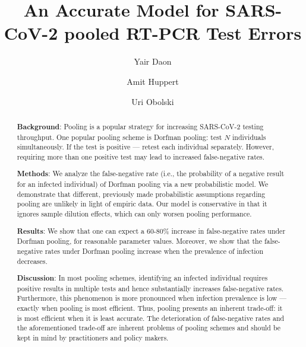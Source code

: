 \documentclass{article}
\begin{document}
\title{An Accurate Model for SARS-CoV-2 pooled RT-PCR Test Errors}

\author[1,2]{Yair Daon}
\author[1,3,*]{Amit Huppert}
\author[1,2,*]{Uri Obolski}



\date{}

\maketitle

\begin{abstract}
\textbf{Background}: Pooling is a popular strategy for increasing
SARS-CoV-2 testing throughput. One popular pooling scheme is Dorfman
pooling: test $N$ individuals simultaneously. If the test is positive
--- retest each individual separately. However, requiring more than
one positive test may lead to increased false-negative rates.

\textbf{Methods}: We analyze the false-negative rate (i.e., the
probability of a negative result for an infected individual) of
Dorfman pooling via a new probabilistic model. We demonstrate that
different, previously made probabilistic assumptions regarding pooling
are unlikely in light of empiric data. Our model is conservative in
that it ignores sample dilution effects, which can only worsen pooling
performance.

\textbf{Results}: We show that one can expect a 60-80\% increase in
false-negative rates under Dorfman pooling, for reasonable parameter
values. Moreover, we show that the false-negative rates under Dorfman
pooling increase when the prevalence of infection decreases.

\textbf{Discussion}: In most pooling schemes, identifying an infected
individual requires positive results in multiple tests and hence
substantially increases false-negative rates. Furthermore, this
phenomenon is more pronounced when infection prevalence is low ---
exactly when pooling is most efficient. Thus, pooling presents an
inherent trade-off: it is most efficient when it is least
accurate. The deterioration of false-negative rates and the
aforementioned trade-off are inherent problems of pooling schemes and
should be kept in mind by practitioners and policy makers.
\end{abstract}
\newpage
\end{document}

